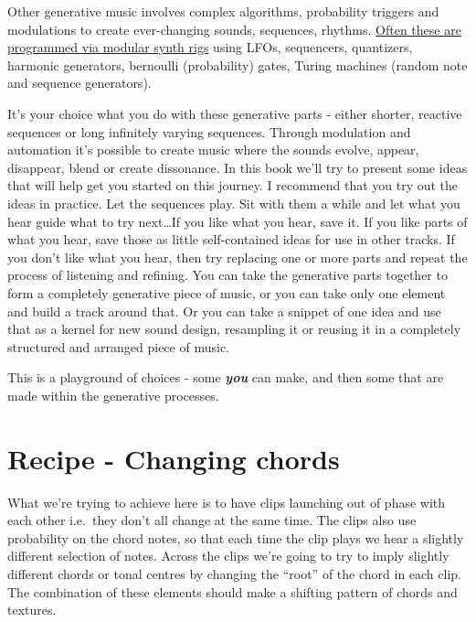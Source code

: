 \documentclass[
  12pt,
  letterpaper,
  oneside,
  open=any]{scrbook}
\begin{document}
Other generative music involves complex algorithms, probability triggers
and modulations to create ever-changing sounds, sequences, rhythms.
\href{https://www.youtube.com/watch?v=uNz1XfVfJak}{Often these are
programmed via modular synth rigs} using LFOs, sequencers, quantizers,
harmonic generators, bernoulli (probability) gates, Turing machines
(random note and sequence generators).

It's your choice what you do with these generative parts - either
shorter, reactive sequences or long infinitely varying sequences.
Through modulation and automation it's possible to create music where
the sounds evolve, appear, disappear, blend or create dissonance. In
this book we'll try to present some ideas that will help get you started
on this journey. I recommend that you try out the ideas in practice. Let
the sequences play. Sit with them a while and let what you hear guide
what to try next\ldots If you like what you hear, save it. If you like
parts of what you hear, save those as little self-contained ideas for
use in other tracks. If you don't like what you hear, then try replacing
one or more parts and repeat the process of listening and refining. You
can take the generative parts together to form a completely generative
piece of music, or you can take only one element and build a track
around that. Or you can take a snippet of one idea and use that as a
kernel for new sound design, resampling it or reusing it in a completely
structured and arranged piece of music.

This is a playground of choices - some \textbf{\emph{you}} can make, and
then some that are made within the generative processes.


\chapter{Recipe - Changing
chords}\label{Chapter-001-Recipe-Changing_Chords}

\begin{tcolorbox}[enhanced jigsaw, opacitybacktitle=0.6, rightrule=.15mm, leftrule=.75mm, opacityback=0, toptitle=1mm, toprule=.15mm, breakable, titlerule=0mm, colback=white, bottomtitle=1mm, title=\textcolor{quarto-callout-tip-color}{\faLightbulb}\hspace{0.5em}{Key idea}, coltitle=black, left=2mm, colframe=quarto-callout-tip-color-frame, bottomrule=.15mm, colbacktitle=quarto-callout-tip-color!10!white, arc=.35mm]

What we're trying to achieve here is to have clips launching out of
phase with each other i.e.~they don't all change at the same time. The
clips also use probability on the chord notes, so that each time the
clip plays we hear a slightly different selection of notes. Across the
clips we're going to try to imply slightly different chords or tonal
centres by changing the ``root'' of the chord in each clip. The
combination of these elements should make a shifting pattern of chords
and textures.

\end{tcolorbox}
\end{document}
